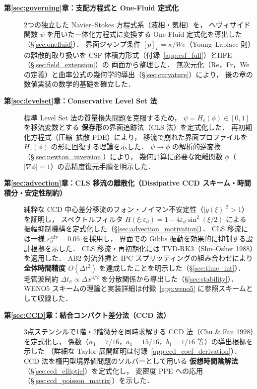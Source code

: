 \begin{description}
  \item[\textbf{第\ref{sec:governing}章：支配方程式と One-Fluid 定式化}]
        2つの独立した Navier--Stokes 方程式系（液相・気相）を，
        ヘヴィサイド関数 $\psi$ を用いた一体化方程式に変換する
        One-Fluid 定式化を導出した（§\ref{sec:onefluid}）．
        界面ジャンプ条件 $[p]_\Gamma=\kappa/We$（Young--Laplace 則）の離散的取り扱いを
        CSF 体積力形式（付録~\ref{app:csf_full}）とHFE（§\ref{sec:field_extension}）の
        両面から整理した．
        無次元化（Re，Fr，We の定義）と曲率公式の幾何学的導出（§\ref{sec:curvature}）により，
        後の章の数値実装の数学的基礎を確立した．

  \item[\textbf{第\ref{sec:levelset}章：Conservative Level Set 法}]
        標準 Level Set 法の質量損失問題を克服するため，
        $\psi = H_\varepsilon(\phi) \in [0,1]$ を移流変数とする
        \textbf{保存形}の界面追跡法（CLS 法）を定式化した．
        再初期化方程式（圧縮--拡散 PDE）により，
        移流で崩れた界面プロファイルを $H_\varepsilon(\phi)$ の形に回復する理論を示した．
        $\psi \to \phi$ の解析的逆変換（§\ref{sec:newton_inversion}）により，
        幾何計算に必要な距離関数 $\phi$（$|\nabla\phi|=1$）の高精度復元手順を明示した．

  \item[\textbf{第\ref{sec:advection}章：CLS 移流の離散化（Dissipative CCD スキーム・時間積分・安定性制約）}]
        純粋な CCD 中心差分移流のフォン・ノイマン不安定性（$|g(\xi)|^2 > 1$）を証明し，
        スペクトルフィルタ $H(\xi;\varepsilon_d) = 1 - 4\varepsilon_d\sin^2(\xi/2)$ による
        振幅抑制機構を定式化した（§\ref{sec:advection_motivation}）．
        CLS 移流には一様 $\varepsilon_d^{\text{adv}} = 0.05$ を採用し，
        界面での Gibbs 振動を効果的に抑制する設計根拠を示した．
        CLS 移流・再初期化には TVD-RK3（Shu--Osher 1988）を適用した．
        AB2 対流外挿と IPC スプリッティングの組み合わせにより
        \textbf{全体時間精度 $O(\Delta t^2)$} を達成したことを明示した（§\ref{sec:time_int}）．
        毛管波制約 $\Delta t_\sigma \propto \Delta x^{3/2}$ を分散関係から導出した（§\ref{sec:stability}）．
        WENO5 スキームの理論と実装詳細は付録~\ref{app:weno5} に参照スキームとして収録した．

  \item[\textbf{第\ref{sec:CCD}章：結合コンパクト差分法（CCD 法）}]
        3点ステンシルで1階・2階微分を同時求解する CCD 法（Chu \& Fan 1998）を定式化し，
        係数（$\alpha_1 = 7/16$，$a_1 = 15/16$，$b_1 = 1/16$ 等）の導出根拠を示した
        （詳細な Taylor 展開証明は付録~\ref{app:ccd_coef_derivation}）．
        CCD 法を楕円型境界値問題のソルバーとして用いる
        \textbf{仮想時間陰解法}（§\ref{sec:ccd_elliptic}）を定式化し，
        変密度 PPE への応用（§\ref{sec:ccd_poisson_matrix}）を示した．


\end{description}
